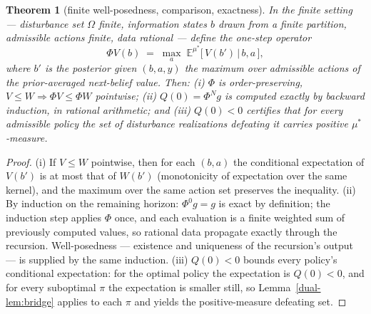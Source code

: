 \documentclass[10pt,twocolumn]{article}
\theoremstyle{plain}
\newtheorem{theorem}{Theorem}
\theoremstyle{definition}
\theoremstyle{remark}
\begin{document}
\begin{theorem}[finite well-posedness, comparison, exactness]
\label{dual-thm:envelope-finite}
In the finite setting --- disturbance set $\Omega$ finite, information
states $b$ drawn from a finite partition, admissible actions finite, data
rational --- define the one-step operator
\[
\Phi V(b) \;=\; \max_{a}\; \mathbb{E}^{\mu^{*}}\bigl[\, V(b') \,\big|\, b, a \,\bigr],
\]
where $b'$ is the posterior given $(b, a, y)$
the maximum over admissible actions of the prior-averaged next-belief
value. Then: (i) $\Phi$ is order-preserving,
$V \le W \Rightarrow \Phi V \le \Phi W$ pointwise; (ii)
$Q(0) = \Phi^{N} g$ is computed exactly by backward induction, in rational
arithmetic; and (iii) $Q(0) < 0$ certifies that for every admissible policy
the set of disturbance realizations defeating it carries positive
$\mu^{*}$-measure.
\end{theorem}
\begin{proof}
(i) If $V \le W$ pointwise, then for each $(b, a)$ the conditional
expectation of $V(b')$ is at most that of $W(b')$ (monotonicity of
expectation over the same kernel), and the maximum over the same action set
preserves the inequality. (ii) By induction on the remaining horizon:
$\Phi^{0} g = g$ is exact by definition; the induction step applies $\Phi$
once, and each evaluation is a finite weighted sum of previously computed
values, so rational data propagate exactly through the recursion.
Well-posedness --- existence and uniqueness of the recursion's output ---
is supplied by the same induction. (iii) $Q(0) < 0$ bounds every policy's
conditional expectation: for the optimal policy the expectation is
$Q(0) < 0$, and for every suboptimal $\pi$ the expectation is smaller
still, so Lemma~\ref{dual-lem:bridge} applies to each $\pi$ and yields the
positive-measure defeating set.
\end{proof}
\end{document}
